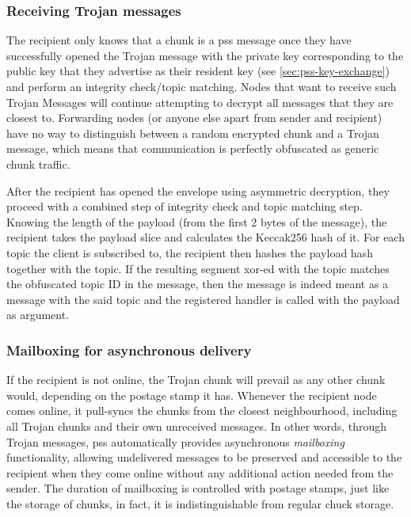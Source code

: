 \subsubsection{Receiving Trojan messages}

The recipient only knows that a chunk is a pss message once they have successfully opened the Trojan message with the private key corresponding to the public key that they advertise as their resident key (see \ref{sec:pss-key-exchange}) and perform an integrity check/topic matching. Nodes that want to receive such Trojan Messages will continue attempting to decrypt all messages that they are closest to. Forwarding nodes (or anyone else apart from sender and recipient) have no way to distinguish between a random encrypted chunk and a Trojan message, which means that communication is perfectly obfuscated as generic chunk traffic.

After the recipient has opened the envelope using asymmetric decryption, they proceed with a combined step of integrity check and topic matching step. Knowing the length of the payload (from the first 2 bytes of the message), the recipient takes the payload slice and calculates the Keccak256 hash of it. For each topic the client is subscribed to, the recipient then hashes the payload hash together with the topic. If the resulting segment xor-ed with the topic matches the obfuscated topic ID in the message, then the message is indeed meant as a message with the said topic and the registered handler is called with the payload as argument.

\subsubsection{Mailboxing for asynchronous delivery}

If the recipient is not online, the Trojan chunk will prevail as any other chunk would, depending on the postage stamp it has. Whenever the recipient node comes online, it pull-syncs the chunks from the closest neighbourhood, including all Trojan chunks and their own unreceived messages. In other words, through Trojan messages, pss automatically provides asynchronous \emph{mailboxing} functionality, allowing undelivered messages to be preserved and accessible to the recipient when they come online without any additional action needed from the sender. The duration of mailboxing is controlled with postage stamps, just like the storage of chunks, in fact, it is indistinguishable from regular chuck storage.

